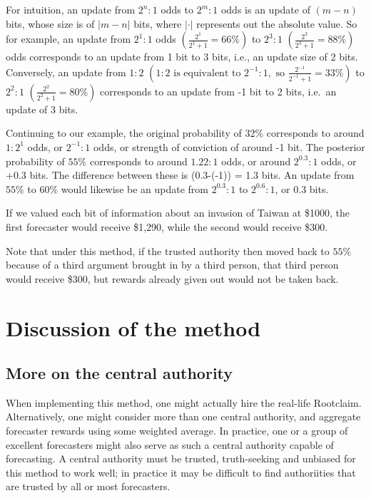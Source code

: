 \documentclass[]{article}
\begin{document}
For intuition, an update from \(2^{n}:1\) odds to \(2^{m}:1\) odds is an
update of \((m-n)\) bits, whose size is of \(|m-n|\) bits, where
\(|\cdot|\) represents out the absolute value. So for example, an update
from \(2^1:1\) odds \(\left(\frac{2^1}{2^1 + 1} = 66\%\right)\) to
\(2^3:1\) \(\left(\frac{2^3}{2^3 + 1} = 88\%\right)\) odds corresponds
to an update from 1 bit to 3 bits, i.e., an update size of 2 bits.
Conversely, an update from \(1:2\)
\(\left(1:2 \text{ is equivalent to } 2^{-1}:1, \text{ so } \frac{2^{-1}}{2^{-1} + 1} = 33\%\right)\)
to \(2^{2}:1\) \(\left(\frac{2^2}{2^2 + 1} = 80\%\right)\) corresponds
to an update from -1 bit to 2 bits, i.e.~an update of 3 bits.

Continuing to our example, the original probability of \(32\%\)
corresponds to around \(1:2^1\) odds, or \(2^{-1}:1\) odds, or strength
of conviction of around -1 bit. The posterior probability of \(55\%\)
corresponds to around \(1.22 : 1\) odds, or around \(2^{0.3} : 1\) odds,
or +0.3 bits. The difference between these is (0.3-(-1)) = 1.3 bits. An
update from \(55\%\) to \(60\%\) would likewise be an update from
\(2^{0.3}:1\) to \(2^{0.6}:1\), or 0.3 bits.

If we valued each bit of information about an invasion of Taiwan at
\$1000, the first forecaster would receive \$1,290, while the second
would receive \$300.

Note that under this method, if the trusted authority then moved back to
\(55\%\) because of a third argument brought in by a third person, that
third person would receive \$300, but rewards already given out would
not be taken back.

\hypertarget{discussion-of-the-method}{%
\section{Discussion of the method}\label{discussion-of-the-method}}

\hypertarget{more-on-the-central-authority}{%
\subsection{More on the central
authority}\label{more-on-the-central-authority}}

When implementing this method, one might actually hire the real-life
Rootclaim. Alternatively, one might consider more than one central
authority, and aggregate forecaster rewards using some weighted average.
In practice, one or a group of excellent forecasters might also serve as
such a central authority capable of forecasting. A central authority
must be trusted, truth-seeking and unbiased for this method to work
well; in practice it may be difficult to find authoriities that are
trusted by all or most forecasters.
\end{document}
